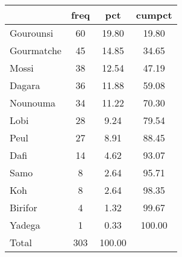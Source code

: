 {
\def\sym#1{\ifmmode^{#1}\else\(^{#1}\)\fi}
\begin{tabular}{l*{1}{ccc}}
\hline\hline
            &        freq&         pct&      cumpct\\
\hline
Gourounsi   &          60&       19.80&       19.80\\
Gourmatche  &          45&       14.85&       34.65\\
Mossi       &          38&       12.54&       47.19\\
Dagara      &          36&       11.88&       59.08\\
Nounouma    &          34&       11.22&       70.30\\
Lobi        &          28&        9.24&       79.54\\
Peul        &          27&        8.91&       88.45\\
Dafi        &          14&        4.62&       93.07\\
Samo        &           8&        2.64&       95.71\\
Koh         &           8&        2.64&       98.35\\
Birifor     &           4&        1.32&       99.67\\
Yadega      &           1&        0.33&      100.00\\
Total       &         303&      100.00&            \\
\hline\hline
\end{tabular}
}
